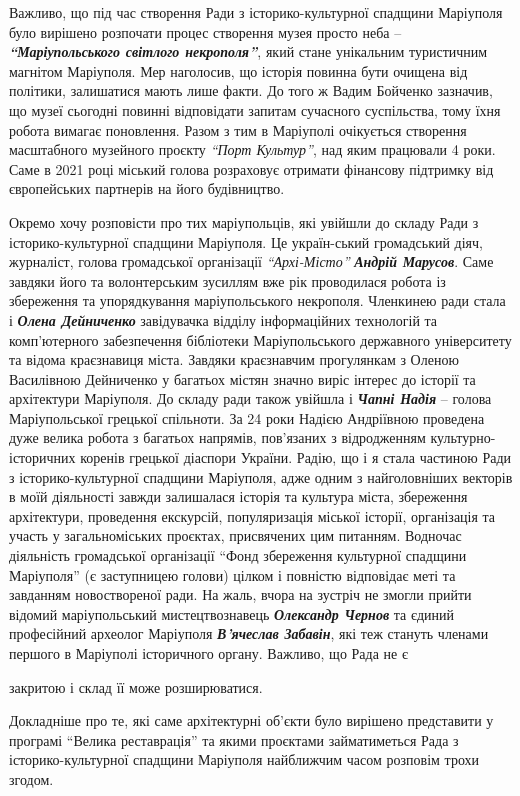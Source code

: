 Важливо, що під час створення Ради з історико-культурної спадщини Маріуполя
було вирішено розпочати процес створення музея просто неба – \emph{\textbf{\enquote{Маріупольського
світлого некрополя}}}, який стане унікальним туристичним магнітом Маріуполя. Мер
наголосив, що історія повинна бути очищена  від політики, залишатися мають лише
факти. До того ж Вадим Бойченко зазначив, що музеї сьогодні повинні відповідати
запитам сучасного суспільства, тому їхня робота вимагає поновлення. Разом з тим
в Маріуполі очікується створення масштабного музейного проєкту \emph{\enquote{Порт Культур}},
над яким працювали 4 роки. Саме в 2021 році міський голова розраховує отримати
фінансову підтримку від європейських партнерів на його будівництво.

Окремо хочу розповісти про тих маріупольців, які увійшли до складу Ради з
історико-культурної спадщини Маріуполя. Це україн\hyp{}ський громадський діяч,
журналіст, голова громадської організації \emph{\enquote{Архі-Місто}} \emph{\textbf{Андрій Марусов}}. Саме
завдяки його та волонтерським  зусиллям вже рік проводилася робота із
збереження та упорядкування маріупольського некрополя. Членкинею ради стала і
\emph{\textbf{Олена Дейниченко}} завідувачка відділу інформаційних технологій та комп'ютерного
забезпечення бібліотеки Маріупольського державного університету та відома
краєзнавиця міста. Завдяки краєзнавчим прогулянкам з Оленою Василівною
Дейниченко у багатьох містян значно виріс інтерес до історії та архітектури
Маріуполя. До складу ради також увійшла і \emph{\textbf{Чапні Надія}} – голова Маріупольської
грецької спільноти.  За 24 роки Надією Андріївною проведена дуже велика робота
з багатьох напрямів, пов'язаних з відродженням культурно-історичних коренів
грецької діаспори України. Радію, що і я стала частиною Ради з
історико-культурної спадщини Маріуполя, адже одним з найголовніших векторів в
моїй діяльності завжди залишалася історія та культура міста, збереження
архітектури, проведення екскурсій, популяризація міської історії, організація
та участь у загальноміських проєктах, присвячених цим питанням. Водночас
діяльність громадської організації \enquote{Фонд збереження культурної спадщини
Маріуполя} (є заступницею голови) цілком і повністю відповідає меті та
завданням новоствореної ради. На жаль, вчора на зустріч не змогли прийти
відомий маріупольський мистецтвознавець \emph{\textbf{Олександр Чернов}} та єдиний професійний
археолог Маріуполя \emph{\textbf{В'ячеслав Забавін}}, які теж стануть членами першого в
Маріуполі історичного органу. Важливо, що Рада не є 

закритою і склад її може розширюватися.

Докладніше про те, які саме архітектурні  об'єкти було вирішено представити у
програмі \enquote{Велика реставрація} та якими проєктами займатиметься Рада з
історико-культурної спадщини Маріуполя найближчим часом розповім трохи згодом.
